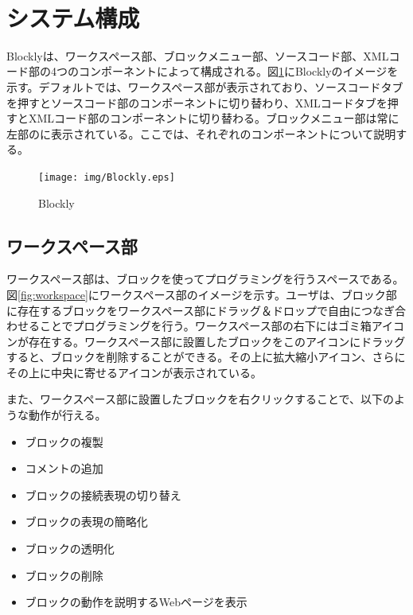 \documentclass{eniepaper}
\begin{document}
　\newpage
  
   \section{システム構成}
   
Blocklyは、ワークスペース部、ブロックメニュー部、ソースコード部、XMLコード部の4つのコンポーネントによって構成される。図\ref{fig:Blockly}にBlocklyのイメージを示す。デフォルトでは、ワークスペース部が表示されており、ソースコードタブを押すとソースコード部のコンポーネントに切り替わり、XMLコードタブを押すとXMLコード部のコンポーネントに切り替わる。ブロックメニュー部は常に左部のに表示されている。ここでは、それぞれのコンポーネントについて説明する。
  

\begin{figure}[h]
\begin{center}
\texttt{[image: img/Blockly.eps]}
\caption{Blockly}%
\label{fig:Blockly}
\end{center}%
\end{figure}%

   \newpage

   \subsection{ワークスペース部}

ワークスペース部は、ブロックを使ってプログラミングを行うスペースである。図\ref{fig:workspace}にワークスペース部のイメージを示す。ユーザは、ブロック部に存在するブロックをワークスペース部にドラッグ＆ドロップで自由につなぎ合わせることでプログラミングを行う。ワークスペース部の右下にはゴミ箱アイコンが存在する。ワークスペース部に設置したブロックをこのアイコンにドラッグすると、ブロックを削除することができる。その上に拡大縮小アイコン、さらにその上に中央に寄せるアイコンが表示されている。

また、ワークスペース部に設置したブロックを右クリックすることで、以下のような動作が行える。

\begin{itemize}
\item ブロックの複製
\item コメントの追加
\item ブロックの接続表現の切り替え
\item ブロックの表現の簡略化
\item ブロックの透明化
\item ブロックの削除
\item ブロックの動作を説明するWebページを表示
\end{itemize} 
   
\end{document}
